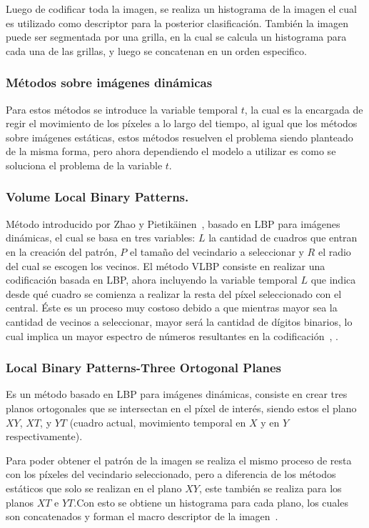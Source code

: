 		Luego de codificar toda la imagen, se realiza un histograma de la imagen el cual es utilizado como descriptor para la posterior clasificación. También la imagen puede ser segmentada por una grilla, en la cual se calcula un histograma para cada una de las grillas, y luego se concatenan en un orden especifico.

	\subsubsection{Métodos sobre imágenes dinámicas}	
	\label{sec:met_videos}
	Para estos métodos se introduce la variable temporal $t$, la cual es la encargada de regir el movimiento de los píxeles a lo largo del tiempo, al igual que los métodos sobre imágenes estáticas, estos métodos resuelven el problema siendo planteado de la misma forma, pero ahora dependiendo el modelo a utilizar es como se soluciona el problema de la variable $t$.

		\subsubsection{Volume Local Binary Patterns.}
		\label{sec:vlbp}
		Método introducido por Zhao y Pietikäinen~\cite{Zhao2006}, basado en LBP para imágenes dinámicas, el cual se basa en tres variables: $L$ la cantidad de cuadros que entran en la creación del patrón, $P$ el tamaño del vecindario a seleccionar y $R$ el radio del cual se escogen los vecinos. 
El método VLBP consiste en realizar una codificación basada en LBP, ahora incluyendo la variable temporal $L$ que indica desde qué cuadro se comienza a realizar la resta del píxel seleccionado con el central.
Éste es un proceso muy costoso debido a que mientras mayor sea la cantidad de vecinos a seleccionar, mayor será la cantidad de dígitos binarios, lo cual implica un mayor espectro de números resultantes en la codificación~\cite{Zhao2007a}, \cite{Zhao2007}.

		\subsubsection{Local Binary Patterns-Three Ortogonal Planes}
		\label{sec:lbp-top}
		 Es un método basado en LBP para imágenes dinámicas, consiste en crear tres planos ortogonales que se intersectan en el píxel de interés, siendo estos el plano $XY$, $XT$, y $YT$ (cuadro actual, movimiento temporal en $X$ y en $Y$ respectivamente). 

Para poder obtener el patrón de la imagen se realiza el mismo proceso de resta con los píxeles del vecindario seleccionado, pero a diferencia de los métodos estáticos que solo se realizan en el plano $XY$, este también se realiza para los planos $XT$ e $YT$.\@ Con esto se obtiene un histograma para cada plano, los cuales son concatenados y forman el macro descriptor de la imagen~\cite{Zhao2007}.


